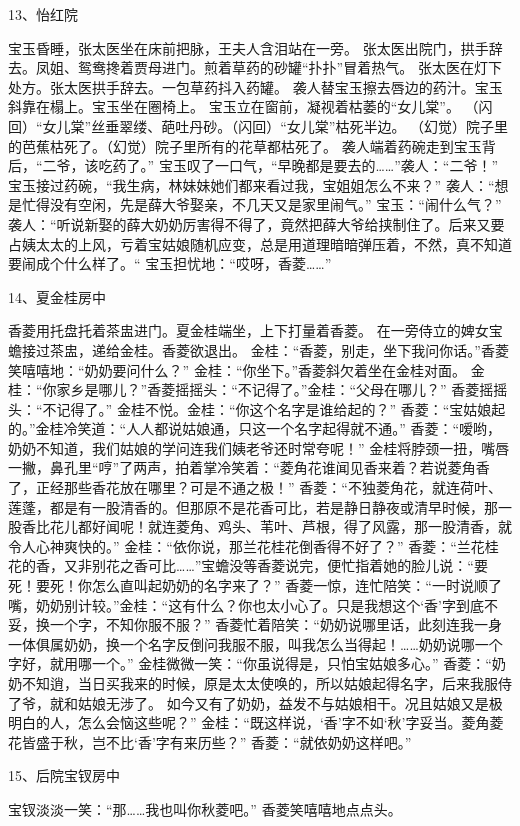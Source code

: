 13、怡红院\par
宝玉昏睡，张太医坐在床前把脉，王夫人含泪站在一旁。
张太医出院门，拱手辞去。凤姐、鸳鸯搀着贾母进门。煎着草药的砂罐“扑扑”冒着热气。
张太医在灯下处方。张太医拱手辞去。一包草药抖入药罐。
袭人替宝玉擦去唇边的药汁。宝玉斜靠在榻上。宝玉坐在圈椅上。
宝玉立在窗前，凝视着枯萎的“女儿棠”。
（闪回）“女儿棠”丝垂翠缕、葩吐丹砂。（闪回）“女儿棠”枯死半边。
（幻觉）院子里的芭蕉枯死了。（幻觉）院子里所有的花草都枯死了。
袭人端着药碗走到宝玉背后，“二爷，该吃药了。”
宝玉叹了一口气，“早晚都是要去的……”袭人：“二爷！”
宝玉接过药碗，“我生病，林妹妹她们都来看过我，宝姐姐怎么不来？”
袭人：“想是忙得没有空闲，先是薛大爷娶亲，不几天又是家里闹气。”
宝玉：“闹什么气？”
袭人：“听说新娶的薛大奶奶厉害得不得了，竟然把薛大爷给挟制住了。后来又要占姨太太的上风，亏着宝姑娘随机应变，总是用道理暗暗弹压着，不然，真不知道要闹成个什么样了。“
宝玉担忧地：“哎呀，香菱……”

14、夏金桂房中\par
香菱用托盘托着茶盅进门。夏金桂端坐，上下打量着香菱。
在一旁侍立的婢女宝蟾接过茶盅，递给金桂。香菱欲退出。
金桂：“香菱，别走，坐下我问你话。”香菱笑嘻嘻地：“奶奶要问什么？”
金桂：“你坐下。”香菱斜欠着坐在金桂对面。
金桂：“你家乡是哪儿？”香菱摇摇头：“不记得了。”金桂：“父母在哪儿？”
香菱摇摇头：“不记得了。”
金桂不悦。金桂：“你这个名字是谁给起的？”
香菱：“宝姑娘起的。”金桂冷笑道：“人人都说姑娘通，只这一个名字起得就不通。”
香菱：“嗳哟，奶奶不知道，我们姑娘的学问连我们姨老爷还时常夸呢！”
金桂将脖颈一扭，嘴唇一撇，鼻孔里“哼”了两声，拍着掌冷笑着：“菱角花谁闻见香来着？若说菱角香了，正经那些香花放在哪里？可是不通之极！”
香菱：“不独菱角花，就连荷叶、莲蓬，都是有一股清香的。但那原不是花香可比，若是静日静夜或清早时候，那一股香比花儿都好闻呢！就连菱角、鸡头、苇叶、芦根，得了风露，那一股清香，就令人心神爽快的。”
金桂：“依你说，那兰花桂花倒香得不好了？”
香菱：“兰花桂花的香，又非别花之香可比……”宝蟾没等香菱说完，便忙指着她的脸儿说：“要死！要死！你怎么直叫起奶奶的名字来了？”
香菱一惊，连忙陪笑：“一时说顺了嘴，奶奶别计较。”金桂：“这有什么？你也太小心了。只是我想这个‘香’字到底不妥，换一个字，不知你服不服？”
香菱忙着陪笑：“奶奶说哪里话，此刻连我一身一体俱属奶奶，换一个名字反倒问我服不服，叫我怎么当得起！……奶奶说哪一个字好，就用哪一个。”
金桂微微一笑：“你虽说得是，只怕宝姑娘多心。”
香菱：“奶奶不知逍，当日买我来的时候，原是太太使唤的，所以姑娘起得名字，后来我服侍了爷，就和姑娘无涉了。
如今又有了奶奶，益发不与姑娘相干。况且姑娘又是极明白的人，怎么会恼这些呢？”
金桂：“既这样说，‘香’字不如‘秋’字妥当。菱角菱花皆盛于秋，岂不比‘香’字有来历些？”
香菱：“就依奶奶这样吧。”

15、后院宝钗房中\par
宝钗淡淡一笑：“那……我也叫你秋菱吧。”
香菱笑嘻嘻地点点头。 


